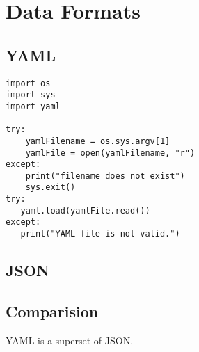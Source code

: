 \section{Data Formats}

\subsection{YAML}


\begin{lstlisting}
import os
import sys
import yaml

try:
    yamlFilename = os.sys.argv[1]
    yamlFile = open(yamlFilename, "r")
except:
    print("filename does not exist")
    sys.exit()
try:
   yaml.load(yamlFile.read())
except:
   print("YAML file is not valid.")
\end{lstlisting}


\subsection{JSON}



\subsection{Comparision}


YAML is a superset of JSON. 

